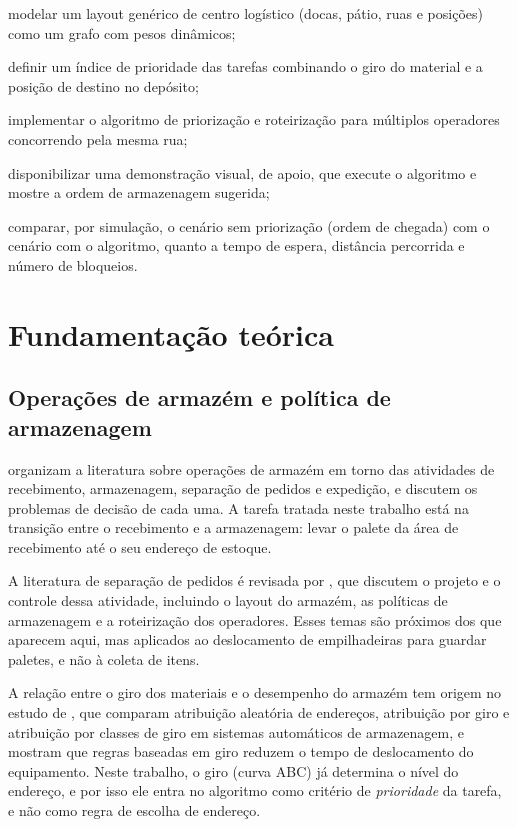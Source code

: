 \documentclass[
	article,
	11pt,
	oneside,
	a4paper,
	english,
	brazil,
	sumario=tradicional
	]{abntex2}
\begin{document}
\begin{alineas}
	\item modelar um layout genérico de centro logístico (docas, pátio, ruas e
	posições) como um grafo com pesos dinâmicos;
	\item definir um índice de prioridade das tarefas combinando o giro do
	material e a posição de destino no depósito;
	\item implementar o algoritmo de priorização e roteirização para múltiplos
	operadores concorrendo pela mesma rua;
	\item disponibilizar uma demonstração visual, de apoio, que execute o
	algoritmo e mostre a ordem de armazenagem sugerida;
	\item comparar, por simulação, o cenário sem priorização (ordem de chegada)
	com o cenário com o algoritmo, quanto a tempo de espera, distância
	percorrida e número de bloqueios.
\end{alineas}

\section{Fundamentação teórica}
\label{sec:teoria}

\subsection{Operações de armazém e política de armazenagem}

 organizam a literatura sobre operações de armazém em
torno das atividades de recebimento, armazenagem, separação de pedidos e
expedição, e discutem os problemas de decisão de cada uma. A tarefa tratada
neste trabalho está na transição entre o recebimento e a armazenagem: levar o
palete da área de recebimento até o seu endereço de estoque.

A literatura de separação de pedidos é revisada por ,
que discutem o projeto e o controle dessa atividade, incluindo o layout do
armazém, as políticas de armazenagem e a roteirização dos operadores. Esses
temas são próximos dos que aparecem aqui, mas aplicados ao deslocamento de
empilhadeiras para guardar paletes, e não à coleta de itens.

A relação entre o giro dos materiais e o desempenho do armazém tem origem no
estudo de , que comparam atribuição aleatória de
endereços, atribuição por giro e atribuição por classes de giro em sistemas
automáticos de armazenagem, e mostram que regras baseadas em giro reduzem o
tempo de deslocamento do equipamento. Neste trabalho, o
giro (curva ABC) já determina o nível do endereço, e por isso ele entra no
algoritmo como critério de \emph{prioridade} da tarefa, e não como regra de
escolha de endereço.
\end{document}
